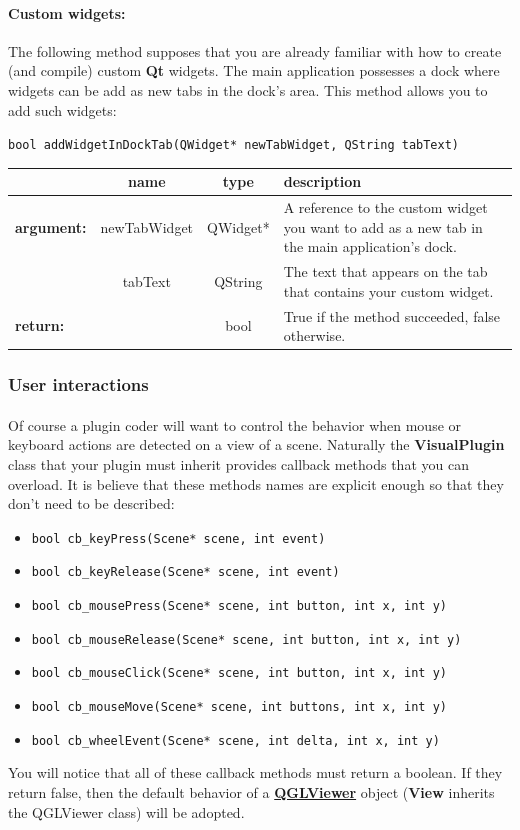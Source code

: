 \documentclass[a4paper]{scrreprt}
\begin{document}
	\paragraph{Custom widgets:}
	The following method supposes that you are already familiar with how to create
	(and compile) custom \textbf{Qt} widgets. The main application possesses a dock
	where widgets can be add as new tabs in the dock's area. This method allows
	you to add such widgets:
	\begin{center}
		\texttt{bool addWidgetInDockTab(QWidget* newTabWidget, QString tabText)}
	\begin{tabular}{|l|c|c|p{}|}
		\hline
		~ & name & type & description
		\\ \hline
		\textbf{argument:} & newTabWidget & QWidget* &
			A reference to the custom widget you want to add as a new tab in the main
			application's dock.
		\\ \cline{2-4}
		~ & tabText & QString &
			The text that appears on the tab that contains your custom widget.
		\\ \hline
		\textbf{return:} & ~ & bool &
			True if the method succeeded, false otherwise.
		\\ \hline
	\end{tabular}
	\end{center}
	
	\subsubsection{User interactions}
	\paragraph{}
	Of course a plugin coder will want to control the behavior when mouse or
	keyboard actions are detected on a view of a scene. Naturally the
	\textbf{VisualPlugin} class that your plugin must inherit provides
	callback methods that you can overload. It is believe that these methods names
	are explicit enough so that they don't need to be described:
	\begin{itemize}
	  \item \texttt{bool cb\_keyPress(Scene* scene, int event)}
	  \item \texttt{bool cb\_keyRelease(Scene* scene, int event)}
	  \item \texttt{bool cb\_mousePress(Scene* scene, int button, int x, int y)}
	  \item \texttt{bool cb\_mouseRelease(Scene* scene, int button, int x, int y)}
	  \item \texttt{bool cb\_mouseClick(Scene* scene, int button, int x, int y)}
	  \item \texttt{bool cb\_mouseMove(Scene* scene, int buttons, int x, int y)}
	  \item \texttt{bool cb\_wheelEvent(Scene* scene, int delta, int x, int y)}
	\end{itemize}
	You will notice that all of these callback methods must return a boolean. If
	they return false, then the default behavior of a
	\href{http://www.libqglviewer.com/refManual/classQGLViewer.html}
	{\textbf{QGLViewer}} object (\textbf{View} inherits the QGLViewer class) will
	be adopted.
	
\end{document}
